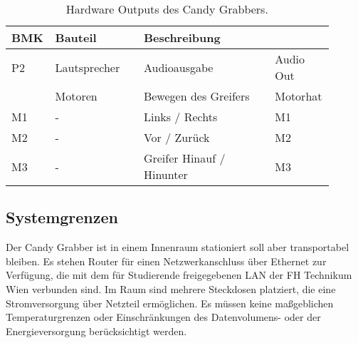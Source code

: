 \documentclass[BMR,Bachelor,ngerman]{twbook}%
\begin{document}
\begin{table}
\caption{Hardware Outputs des Candy Grabbers.}\label{tab:Os}
\begin{tabular}{| p{0.08\linewidth} | p{0.27\linewidth} | p{0.4\linewidth} | p{0.15\linewidth} |}\hline
\rowcolor[gray]{0.8} BMK & Bauteil & Beschreibung & \\\hline
P2 & Lautsprecher & Audioausgabe & Audio Out\\\hline
 & Motoren & Bewegen des Greifers& Motorhat\\
 M1 & - & Links / Rechts & M1\\
 M2 & - & Vor / Zurück & M2\\
 M3 & - & Greifer Hinauf / Hinunter & M3\\\hline
\end{tabular}
\end{table}
%
\subsection{Systemgrenzen}
Der Candy Grabber ist in einem Innenraum stationiert soll aber transportabel bleiben. Es stehen Router für einen Netzwerkanschluss über Ethernet zur Verfügung, die mit dem für Studierende freigegebenen \ac{LAN} der FH Technikum Wien verbunden sind. Im Raum sind mehrere Steckdosen platziert, die eine Stromversorgung über Netzteil ermöglichen. Es müssen keine maßgeblichen Temperaturgrenzen oder Einschränkungen des Datenvolumens- oder der Energieversorgung berücksichtigt werden. 
%
\end{document}
